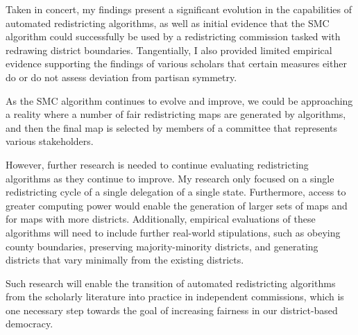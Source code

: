 Taken in concert, my findings present a significant evolution in the capabilities of automated redistricting algorithms, as well as initial evidence that the SMC algorithm could successfully be used by a redistricting commission tasked with redrawing district boundaries. Tangentially, I also provided limited empirical evidence supporting the findings of various scholars that certain measures either do or do not assess deviation from partisan symmetry.

As the SMC algorithm continues to evolve and improve, we could be approaching a reality where a number of fair redistricting maps are generated by algorithms, and then the final map is selected by members of a committee that represents various stakeholders.

However, further research is needed to continue evaluating redistricting algorithms as they continue to improve. My research only focused on a single redistricting cycle of a single delegation of a single state. Furthermore, access to greater computing power would enable the generation of larger sets of maps and for maps with more districts. Additionally, empirical evaluations of these algorithms will need to include further real-world stipulations, such as obeying county boundaries, preserving majority-minority districts, and generating districts that vary minimally from the existing districts. 

Such research will enable the transition of automated redistricting algorithms from the scholarly literature into practice in independent commissions, which is one necessary step towards the goal of increasing fairness in our district-based democracy. 